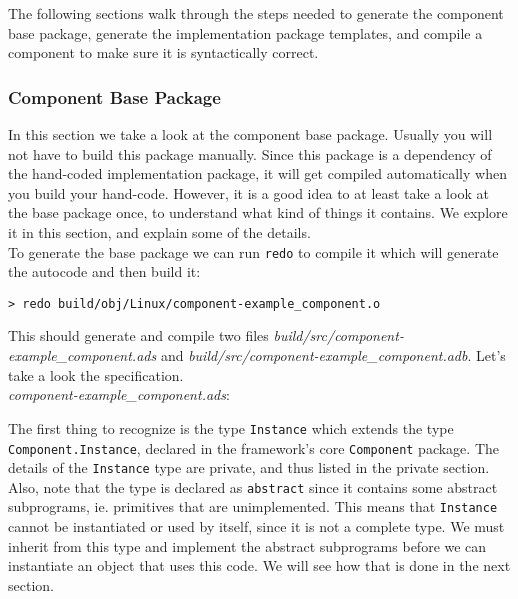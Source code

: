 The following sections walk through the steps needed to generate the component base package, generate the implementation package templates, and compile a component to make sure it is syntactically correct.

\subsubsection{Component Base Package} \label{Component Base Package}

In this section we take a look at the component base package. Usually you will not have to build this package manually. Since this package is a dependency of the hand-coded implementation package, it will get compiled automatically when you build your hand-code. However, it is a good idea to at least take a look at the base package once, to understand what kind of things it contains. We explore it in this section, and explain some of the details. \\

To generate the base package we can run \texttt{redo} to compile it which will generate the autocode and then build it:

\vspace{5mm} %
\begin{verbatim}
> redo build/obj/Linux/component-example_component.o
\end{verbatim}
\vspace{5mm} %

This should generate and compile two files \textit{build/src/component-example\_component.ads} and \textit{build/src/component-example\_component.adb}. Let's take a look the specification. \\

\textit{component-example\_component.ads}:

The first thing to recognize is the type \texttt{Instance} which extends the type \texttt{Component.Instance}, declared in the framework's core \texttt{Component} package. The details of the \texttt{Instance} type are private, and thus listed in the private section. Also, note that the type is declared as \texttt{abstract} since it contains some abstract subprograms, ie. primitives that are unimplemented. This means that \texttt{Instance} cannot be instantiated or used by itself, since it is not a complete type. We must inherit from this type and implement the abstract subprograms before we can instantiate an object that uses this code. We will see how that is done in the next section. \\

